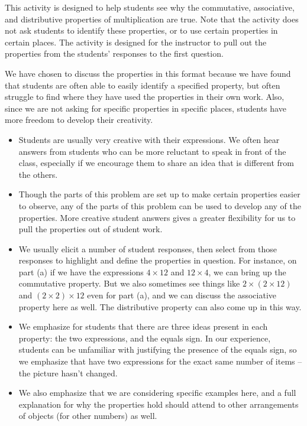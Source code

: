 \documentclass[nooutcomes,noauthor,handout]{ximera}
\begin{document}
\newpage
\begin{instructorNotes}
This activity is designed to help students see why the commutative, associative, and distributive properties of multiplication are true.  Note that the activity does not ask students to identify these properties, or to use certain properties in certain places.  The activity is designed for the instructor to pull out the properties from the students' responses to the first question.

We have chosen to discuss the properties in this format because we have found that students are often able to easily identify a specified property, but often struggle to find where they have used the properties in their own work.  Also, since we are not asking for specific properties in specific places, students have more freedom to develop their creativity.

\begin{itemize}
    \item Students are usually very creative with their expressions.  We often hear answers from students who can be more reluctant to speak in front of the class, especially if we encourage them to share an idea that is different from the others.
    \item Though the parts of this problem are set up to make certain properties easier to observe, any of the parts of this problem can be used to develop any of the properties.  More creative student answers gives a greater flexibility for us to pull the properties out of student work.
    \item We usually elicit a number of student responses, then select from those responses to highlight and define the properties in question.  For instance, on part (a) if we have the expressions $4 \times 12$ and $12 \times 4$, we can bring up the commutative property.  But we also sometimes see things like $2 \times (2\times 12)$ and $(2 \times 2) \times 12$ even for part (a), and we can discuss the associative property here as well.  The distributive property can also come up in this way.
    \item We emphasize for students that there are three ideas present in each property: the two expressions, and the equals sign.  In our experience, students can be unfamiliar with justifying the presence of the equals sign, so we emphasize that have two expressions for the exact same number of items -- the picture hasn't changed.
    \item We also emphasize that we are considering specific examples here, and a full explanation for why the properties hold should attend to other arrangements of objects (for other numbers) as well.
\end{itemize}



\end{instructorNotes}
\end{document}
